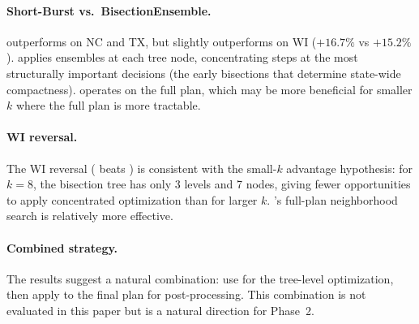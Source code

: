 \paragraph{Short-Burst vs.\ BisectionEnsemble.}
\be{} outperforms \shb{} on NC and TX, but \shb{} slightly outperforms
\be{} on WI ($+16.7\%$ vs $+15.2\%$).
\be{} applies ensembles at each tree node, concentrating steps at
the most structurally important decisions (the early bisections that
determine state-wide compactness).
\shb{} operates on the full plan, which may be more beneficial for
smaller $k$ where the full plan is more tractable.

\paragraph{WI reversal.}
The WI reversal (\shb{} beats \be{}) is consistent with the small-$k$
advantage hypothesis: for $k = 8$, the bisection tree has only
3 levels and 7 nodes, giving \be{} fewer opportunities to apply
concentrated optimization than for larger $k$.
\shb{}'s full-plan neighborhood search is relatively more effective.

\paragraph{Combined strategy.}
The results suggest a natural combination: use \be{} for the tree-level
optimization, then apply \shb{} to the final plan for post-processing.
This combination is not evaluated in this paper but is a natural
direction for Phase~2.
